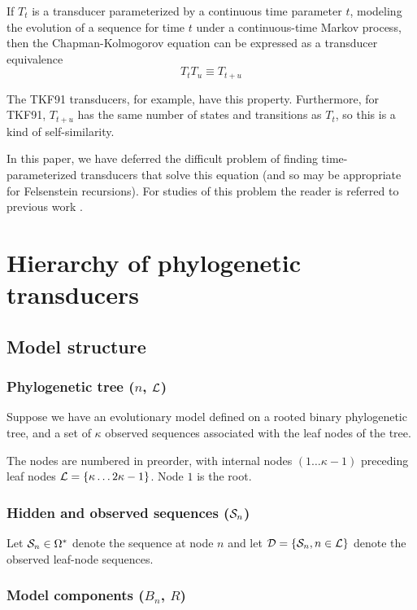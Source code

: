 \documentclass{article}
\newcommand\transequiv{\equiv}
\newcommand\compose{}
\newcommand\numberofleaves{\kappa}
\newcommand\numberofinternalnodes{\numberofleaves - 1}
\newcommand\numberofnodes{2\numberofleaves - 1}
\newcounter{LeafIndex}
\newcommand\leafnode[1]{\numberofleaves \ifthenelse{\equal{#1}{1}}{}{\setcounter{LeafIndex}{#1} \addtocounter{LeafIndex}{-1} +\arabic{LeafIndex}}}
\newcommand\leaves{{\cal L}}
\newcommand\outputs{{\cal D}}
\newcommand\outputn[1]{{\cal S}_{#1}}
\begin{document}
If $T_t$ is a transducer parameterized by a continuous time parameter $t$,
modeling the evolution of a sequence for time $t$ under a continuous-time Markov process,
then the Chapman-Kolmogorov equation \cite{KarlinTaylor75} can be expressed as a transducer equivalence
\[
T_t \compose T_u \transequiv T_{t+u}
\]

The TKF91 transducers, for example, have this property.
Furthermore, for TKF91, $T_{t+u}$ has the same number of states and transitions as $T_t$,
so this is a kind of self-similarity.

In this paper, we have deferred the difficult problem of finding time-parameterized transducers that solve this equation
(and so may be appropriate for Felsenstein recursions).
For studies of this problem the reader is referred to previous work \cite{ThorneEtal91,ThorneEtal92,KnudsenMiyamoto2003,MiklosLunterHolmes2004,Rivas05}.

\section{Hierarchy of phylogenetic transducers}
\label{hierarchy}

\subsection{Model structure}

\subsubsection{Phylogenetic tree ($n$, $\leaves$)}
Suppose we have an evolutionary model defined on a rooted binary phylogenetic tree,
and a set of $\numberofleaves$ observed sequences associated with the leaf nodes of the tree.

The nodes are numbered in preorder, with internal nodes $(1 \ldots \numberofinternalnodes)$ preceding leaf nodes $\leaves = \{ \leafnode{1} \ldots \numberofnodes \}$. Node $1$ is the root.

\subsubsection{Hidden and observed sequences ($\outputn{n}$)}

Let $\outputn{n} \in \Omega^\ast$ denote the sequence at node $n$ and
let $\outputs = \{ \outputn{n}, n \in \leaves \}$ denote the observed leaf-node sequences.

\subsubsection{Model components ($B_n$, $R$)}
\end{document}
